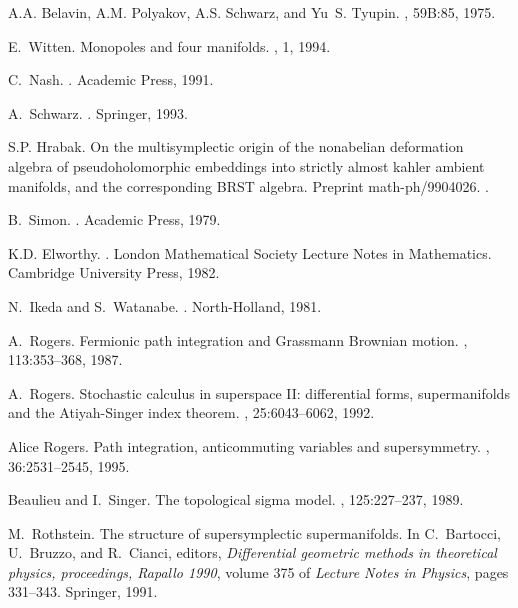 \documentclass[a4paper,fleqn,12pt]{article}
\begin{document}
\begin{thebibliography}{9}

A.A. Belavin, A.M. Polyakov, A.S. Schwarz, and Yu~S. Tyupin.
, 59B:85, 1975.

E.~Witten.
\newblock Monopoles and four manifolds.
, 1, 1994.

C.~Nash.
.
\newblock Academic Press, 1991.

A.~Schwarz.
.
\newblock Springer, 1993.

S.P. Hrabak.
\newblock On the multisymplectic origin of the nonabelian deformation algebra
  of pseudoholomorphic embeddings into strictly almost kahler ambient
  manifolds, and the corresponding {BRST} algebra.
  \newblock Preprint math-ph/9904026.
.

B.~Simon.
.
\newblock Academic Press, 1979.

K.D. Elworthy.
.
\newblock London Mathematical Society Lecture Notes in Mathematics. Cambridge
  University Press, 1982.

N.~Ikeda and S.~Watanabe.
.
\newblock North-Holland, 1981.

A.~Rogers.
\newblock Fermionic path integration and {G}rassmann {B}rownian motion.
, 113:353--368, 1987.

A.~Rogers.
\newblock Stochastic calculus in superspace {II}: differential forms,
  supermanifolds and the {A}tiyah-{S}inger index theorem.
, 25:6043--6062, 1992.

Alice Rogers.
\newblock Path integration, anticommuting variables and supersymmetry.
, 36:2531--2545, 1995.

Beaulieu and I.~Singer.
\newblock The topological sigma model.
, 125:227--237, 1989.

M.~Rothstein.
\newblock The structure of supersymplectic supermanifolds.
\newblock In C.~Bartocci, U.~Bruzzo, and R.~Cianci, editors, {\em Differential
  geometric methods in theoretical physics, proceedings, Rapallo 1990}, volume
  375 of {\em Lecture Notes in Physics}, pages 331--343. Springer, 1991.


\end{thebibliography}
\end{document}
